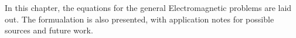 In this chapter, the equations for the general Electromagnetic problems are laid out. The \fem formualation is also presented, with application notes for possible sources and future work.